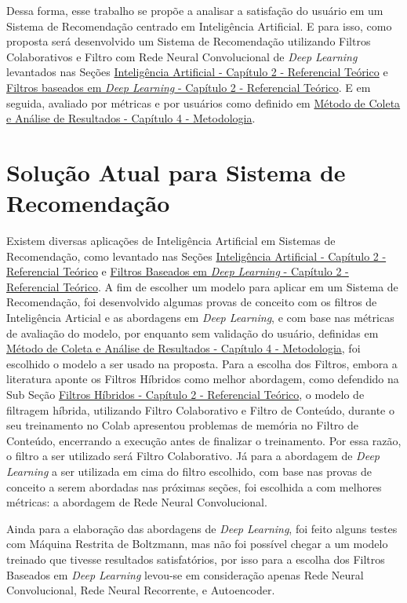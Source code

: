 Dessa forma, esse trabalho se propõe a analisar a satisfação do usuário em um Sistema de Recomendação centrado em Inteligência
Artificial. E para isso, como proposta será desenvolvido um Sistema de Recomendação utilizando Filtros Colaborativos e 
Filtro com Rede Neural Convolucional de \textit{Deep Learning} levantados nas Seções \hyperref[sec:ia]{Inteligência Artificial - Capítulo 2 - Referencial Teórico} e 
\hyperref[sec:filtrodeep]{Filtros baseados em \textit{Deep Learning} - Capítulo 2 - Referencial Teórico}. E em seguida, avaliado
por métricas e por usuários como definido em \hyperref[sec:meteanresul]{Método de Coleta e Análise de Resultados - Capítulo 4 - Metodologia}.

\section{Solução Atual para Sistema de Recomendação}\label{sec:poc}

Existem diversas aplicações de Inteligência Artificial em Sistemas de Recomendação, como levantado nas Seções 
\hyperref[sec:ia]{Inteligência Artificial - Capítulo 2 - Referencial Teórico} e 
\hyperref[sec:filtrodeep]{Filtros Baseados em \textit{Deep Learning} - Capítulo 2 - Referencial Teórico}. A fim de escolher um
modelo para aplicar em um Sistema de Recomendação, foi desenvolvido algumas provas de conceito com os filtros de Inteligência
Articial e as abordagens em \textit{Deep Learning}, e com base nas métricas de avaliação do modelo, por enquanto sem 
validação do usuário, definidas em \hyperref[sec:meteanresul]{Método de Coleta e Análise de Resultados - Capítulo 4 - Metodologia}, 
foi escolhido o modelo a ser usado na proposta. 
Para a escolha dos Filtros, embora a literatura aponte os Filtros Híbridos
como melhor abordagem, como defendido na Sub Seção \hyperref[subsec:hibridos]{Filtros Híbridos - Capítulo 2 - Referencial Teórico},
o modelo de filtragem híbrida, utilizando Filtro Colaborativo e Filtro de Conteúdo, durante o seu treinamento no Colab 
\cite{colabsite} apresentou problemas de memória no Filtro de Conteúdo, encerrando
a execução antes de finalizar o treinamento. Por essa razão, o filtro a ser utilizado será Filtro Colaborativo. Já para a 
abordagem de \textit{Deep Learning} a ser utilizada em cima do filtro escolhido, com base nas provas de conceito a serem abordadas
nas próximas seções, foi escolhida a com melhores métricas: a abordagem de Rede Neural Convolucional.

Ainda para a elaboração das abordagens de \textit{Deep Learning}, foi feito alguns testes com Máquina Restrita de Boltzmann,
mas não foi possível chegar a um modelo treinado que tivesse resultados satisfatórios, por isso para a escolha dos
Filtros Baseados em \textit{Deep Learning} levou-se em consideração apenas Rede Neural Convolucional, Rede Neural Recorrente,
e Autoencoder.

